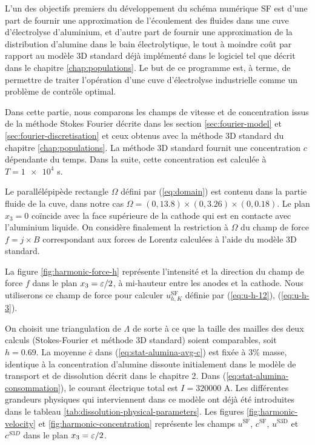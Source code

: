 \renewcommand{\floatpagefraction}{.9}%
\renewcommand{\topfraction}{0.9}

L'un des objectifs premiers du développement du schéma numérique
SF est d'une part de fournir une approximation de l'écoulement des
fluides dans une cuve d'électrolyse d'aluminium, et d'autre part
de fournir une approximation de la distribution d'alumine dans le bain
électrolytique, le tout à moindre coût par rapport au modèle
3D standard déjà implémenté dans le logiciel \citealucell tel que décrit
dans le chapitre \ref{chap:populations}. Le but de ce programme est,
à terme, de permettre de traiter l'opération d'une cuve
d'électrolyse industrielle comme un problème de contrôle optimal.

Dans cette partie, nous comparons les champs de vitesse et de
concentration issus de la méthode Stokes Fourier décrite dans les
section \ref{sec:fourier-model} et \ref{sec:fourier-discretisation} et
ceux obtenus avec la méthode 3D standard du chapitre
\ref{chap:populations}. La méthode 3D standard fournit une
concentration $c$ dépendante du temps. Dans la suite, cette
concentration est calculée à $T = \num{1e4}$ \si{\second}.

Le parallélépipède rectangle $\Omega$ défini par (\ref{eq:domain}) est
contenu dans la partie fluide de la cuve, dans notre cas $\Omega = (0,
\num{13.8})\times(0,\num{3.26})\times(0,\num{0.18})$. Le plan $x_3 =
0$ coïncide avec la face supérieure de la cathode qui est en contacte
avec l'aluminium liquide. On considère finalement la restriction à
$\Omega$ du champ de force $f = j\times B$ correspondant aux forces de
Lorentz calculées à l'aide du modèle 3D standard.

La figure \ref{fig:harmonic-force-h} représente l'intensité et la
direction du champ de force $f$ dans le plan $x_3 = \varepsilon / 2$,
à mi-hauteur entre les anodes et la cathode. Nous utiliserons ce champ
de force pour calculer $u_{h,K}^\mathrm{SF}$ définie par
(\ref{eq:u-h-12}), (\ref{eq:u-h-3}).

On choisit une triangulation de $\Lambda$ de sorte à ce que la taille
des mailles des deux calculs (Stokes-Fourier et méthode 3D standard)
soient comparables, soit $h = \num{0.69}$. La moyenne $\bar{c}$ dans
(\ref{eq:stat-alumina-avg-c}) est fixée à 3\% masse, identique à la
concentration d'alumine dissoute initialement dans le modèle de transport
et de dissolution décrit dans le chapitre 2. Dans
(\ref{eq:stat-alumina-consommation}), le courant électrique total est $I =
\num{320000}$ \si{\ampere}. Les différentes grandeurs physiques qui
interviennent dans ce modèle ont déjà été introduites dans le tableau
\ref{tab:dissolution-physical-parameters}. Les figures
\ref{fig:harmonic-velocity} et \ref{fig:harmonic-concentration}
représente les champs $u^{\mathrm{SF}}$, $c^\mathrm{SF}$,
$u^\mathrm{S3D}$ et $c^{S3D}$ dans le plan $x_3 = \varepsilon / 2$.

